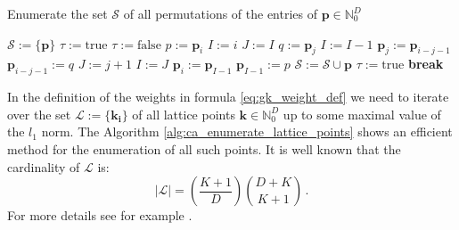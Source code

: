 \documentclass[a4paper,10pt]{article}
\begin{document}
\begin{algorithm}[h!]
  \caption{Enumerate the set $\mathcal{S}$ of all permutations
    of the entries of $\mathbf{p} \in \mathbb{N}_{0}^{D}$}
  \label{alg:ca_enumerate_permutations}
  \begin{algorithmic}
      \State $\mathcal{S} := \{\mathbf{p}\}$
      \State $\tau := \mathrm{true}$
        \State $\tau := \mathrm{false}$
          \State $p := \mathbf{p}_{i}$
            \State $I := i$
              \State $J := I$
                \State $q := \mathbf{p}_{j}$
                  \State $I := I - 1$
                \EndIf
                \State $\mathbf{p}_{j} := \mathbf{p}_{i-j-1}$
                \State $\mathbf{p}_{i-j-1} := q$
                  \State $J := j + 1$
                \EndIf
              \EndFor
                \State $I := J$
              \EndIf
            \EndIf
            \State $\mathbf{p}_{i} := \mathbf{p}_{I-1}$
            \State $\mathbf{p}_{I-1} := p$
            \State $\mathcal{S} := \mathcal{S} \cup \mathbf{p}$
            \State $\tau := \mathrm{true}$
            \State \bf{break}
          \EndIf
        \EndFor
      \EndWhile
    \EndProcedure
  \end{algorithmic}
\end{algorithm}

In the definition of the weights in formula \eqref{eq:gk_weight_def}
we need to iterate over the set $\mathcal{L} := \{\mathbf{k_{i}}\}$ of all
lattice points $\mathbf{k} \in \mathbb{N}_{0}^{D}$ up to some maximal value of
the $l_{1}$ norm. The Algorithm \ref{alg:ca_enumerate_lattice_points}
shows an efficient method for the enumeration of all such points. It
is well known that the cardinality of $\mathcal{L}$ is:
\begin{equation}
  |\mathcal{L}| = \left(\frac{K+1}{D}\right) \binom{D+K}{K+1} \,.
\end{equation}
For more details see for example \cite{serra-sagrista}.
\end{document}
